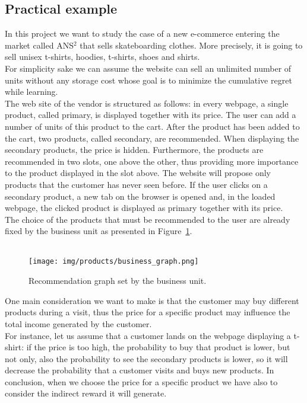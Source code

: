 \subsection*{Practical example}
In this project we want to study the case of a new e-commerce entering the market called ANS$^2$ that sells skateboarding clothes. More precisely, it is going to sell unisex t-shirts, hoodies, t-shirts, shoes and shirts.\\ For simplicity sake we can assume the website can sell an unlimited number of units without any storage cost whose goal is to minimize the cumulative regret while learning.\\
The web site of the vendor is structured as follows: in every webpage, a single product, called primary, is displayed together with its price. The user can add a number of units of this product to the cart. After the product has been added to the cart, two products, called secondary, are recommended. When displaying the secondary products, the price is hidden. Furthermore, the products are recommended in two slots, one above the other, thus providing more importance to the product displayed in the slot above. The website will propose only products that the customer has never seen before.
If the user clicks on a secondary product, a new tab on the browser is opened and, in the loaded webpage, the clicked product is displayed as primary together with its price.\\
The choice of the products that must be recommended to the user are already fixed by the business unit as presented in Figure~\ref{fig:business_graph}.\\\\
\begin{figure}
    \centering
    \texttt{[image: img/products/business\_graph.png]}
    \caption{Recommendation graph set by the business unit.}
    \label{fig:business_graph}
\end{figure}
One main consideration we want to make is that the customer may buy different products during a visit, thus the price for a specific product may influence the total income generated by the customer.\\ For instance, let us assume that a customer lands on the webpage displaying a t-shirt: if the price is too high, the probability to buy that product is lower, but not only, also the probability to see the secondary products is lower, so it will decrease the probability that a customer visits and buys new products. In conclusion, when we choose the price for a specific product we have also to consider the indirect reward it will generate.